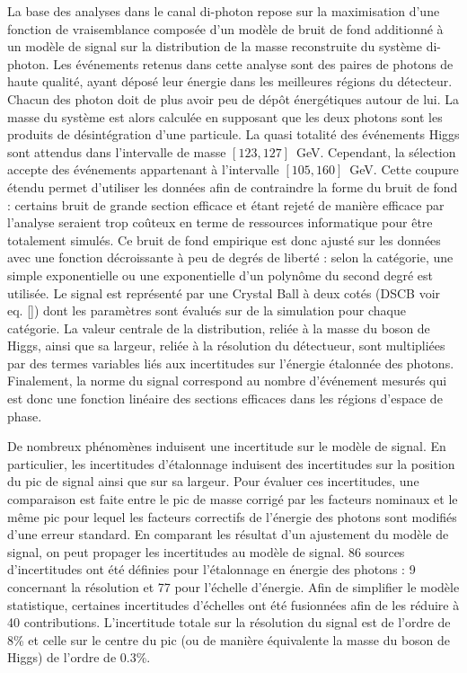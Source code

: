 La base des analyses dans le canal di-photon repose sur la maximisation d'une fonction de vraisemblance composée d'un modèle de bruit de fond additionné à un modèle de signal sur la distribution de la masse reconstruite du système di-photon.
Les événements retenus dans cette analyse sont des paires de photons de haute qualité, ayant déposé leur énergie dans les meilleures régions du détecteur.
Chacun des photon doit de plus avoir peu de dépôt énergétiques autour de lui.
La masse du système est alors calculée en supposant que les deux photons sont les produits de désintégration d'une particule.
La quasi totalité des événements Higgs sont attendus dans l'intervalle de masse $[123, 127]$~GeV.
Cependant, la sélection accepte des événements appartenant à l'intervalle $[105, 160]$~GeV.
Cette coupure étendu permet d'utiliser les données afin de contraindre la forme du bruit de fond : certains bruit de grande section efficace et étant rejeté de manière efficace par l'analyse seraient trop coûteux en terme de ressources informatique pour être totalement simulés.
Ce bruit de fond empirique est donc ajusté sur les données avec une fonction décroissante à peu de degrés de liberté : selon la catégorie, une simple exponentielle ou une exponentielle d'un polynôme du second degré est utilisée.
Le signal est représenté par une Crystal Ball à deux cotés (DSCB voir eq. \ref{}) dont les paramètres sont évalués sur de la simulation pour chaque catégorie.
La valeur centrale de la distribution, reliée à la masse du boson de Higgs, ainsi que sa largeur, reliée à la résolution du détectueur, sont multipliées par des termes variables liés aux incertitudes sur l'énergie étalonnée des photons.
Finalement, la norme du signal correspond au nombre d'événement mesurés qui est donc une fonction linéaire des sections efficaces dans les régions d'espace de phase.

De nombreux phénomènes induisent une incertitude sur le modèle de signal.
En particulier, les incertitudes d'étalonnage induisent des incertitudes sur la position du pic de signal ainsi que sur sa largeur.
Pour évaluer ces incertitudes, une comparaison est faite entre le pic de masse corrigé par les facteurs nominaux et le même pic pour lequel les facteurs correctifs de l'énergie des photons sont modifiés d'une erreur standard.
En comparant les résultat d'un ajustement du modèle de signal, on peut propager les incertitudes au modèle de signal.
86 sources d'incertitudes ont été définies pour l'étalonnage en énergie des photons : 9 concernant la résolution et 77 pour l'échelle d'énergie.
Afin de simplifier le modèle statistique, certaines incertitudes d'échelles ont été fusionnées afin de les réduire à 40 contributions.
L'incertitude totale sur la résolution du signal est de l'ordre de 8\% et celle sur le centre du pic (ou de manière équivalente la masse du boson de Higgs) de l'ordre de 0.3\%.


